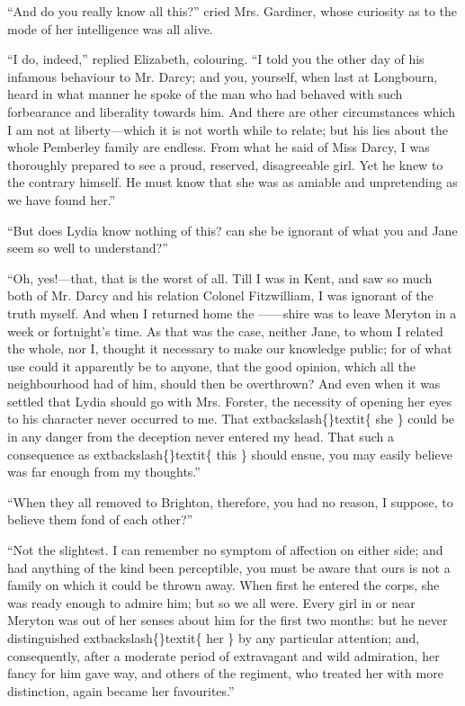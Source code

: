 \documentclass[10pt]{book}
\begin{document}
   “And do you really know all this?” cried Mrs. Gardiner, whose curiosity
as to the mode of her intelligence was all alive.
  

   “I do, indeed,” replied Elizabeth, colouring. “I told you the other day
of his infamous behaviour to Mr. Darcy; and you, yourself, when last at
Longbourn, heard in what manner he spoke of the man who had behaved with
such forbearance and liberality towards him. And there are other
circumstances which I am not at liberty—which it is not worth while to
relate; but his lies about the whole Pemberley family are endless. From
what he said of Miss Darcy, I was thoroughly prepared to see a proud,
reserved, disagreeable girl. Yet he knew to the contrary himself. He
must know that she was as amiable and unpretending as we have found
her.”
  

   “But does Lydia know nothing of this? can she be ignorant of what you
and Jane seem so well to understand?”
  

   “Oh, yes!—that, that is the worst of all. Till I was in Kent, and saw
so much both of Mr. Darcy and his relation Colonel Fitzwilliam, I was
   ignorant of the truth myself. And when I returned home the ——shire
was to leave Meryton in a week or fortnight’s time. As that was the
case, neither Jane, to whom I related the whole, nor I, thought it
necessary to make our knowledge public; for of what use could it
apparently be to anyone, that the good opinion, which all the
neighbourhood had of him, should then be overthrown? And even when it
was settled that Lydia should go with Mrs. Forster, the necessity of
opening her eyes to his character never occurred to me. That
   	extbackslash\{\}textit\{
    she
   \}
   could
be in any danger from the deception never entered my head. That such a
consequence as
   	extbackslash\{\}textit\{
    this
   \}
   should ensue, you may easily believe was far
enough from my thoughts.”
  

   “When they all removed to Brighton, therefore, you had no reason, I
suppose, to believe them fond of each other?”
  

   “Not the slightest. I can remember no symptom of affection on either
side; and had anything of the kind been perceptible, you must be aware
that ours is not a family on which it could be thrown away. When first
he entered the corps, she was ready enough to admire him; but so we all
were. Every girl in or near Meryton was out of her senses about him for
the first two months: but he never distinguished
   	extbackslash\{\}textit\{
    her
   \}
   by any particular
attention; and, consequently, after a moderate period of extravagant and
wild admiration, her fancy for him gave way, and others of the regiment,
who treated her with more distinction, again became her favourites.”
  
\end{document}
